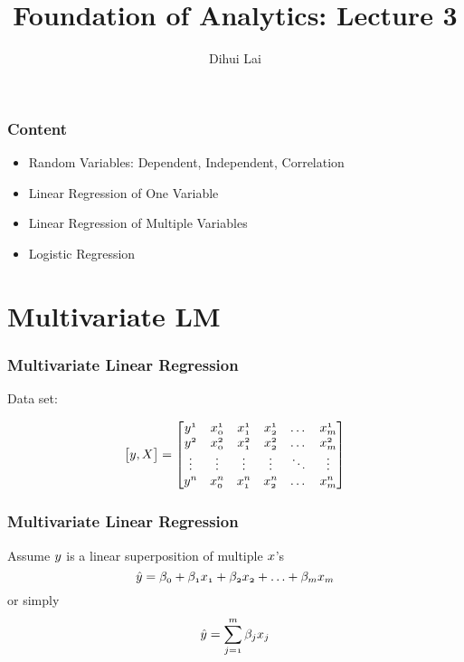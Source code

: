 \documentclass[notheorems, aspectratio=54]{beamer}
\title{Foundation of Analytics: Lecture 3}
\author{Dihui Lai}
\institute[WUSTL]{dlai@wustl.edu}
\begin{document}
\begin{frame}
    \titlepage
\end{frame}


\begin{frame}
\frametitle{Content}

\begin{itemize}
\item Random Variables: Dependent, Independent, Correlation 
\item Linear Regression of One Variable
\item Linear Regression of Multiple Variables
\item Logistic Regression
\end{itemize}
\end{frame}


\section{Multivariate LM}
\begin{frame}
\frametitle{Multivariate Linear Regression}
Data set:

$$
\begin{bmatrix}

\mathnormal{y, X}

\end{bmatrix}
=
\begin{bmatrix}
    \mathnormal{{y}^{1}}& \mathnormal{x^{1}_{0}}& \mathnormal{x^{1}_{1}} & \mathnormal{x^{1}_{2}} & \dots & \mathnormal{x^{1}_{m}} \\
    \mathnormal{{y}^{2}}& \mathnormal{x^{2}_{0}}& \mathnormal{x^{2}_{1}} & \mathnormal{x^{2}_{2}} & \dots & \mathnormal{x^{2}_{m}} \\
    	\vdots & \vdots     & \vdots & \vdots &\ddots &\vdots\\
    \mathnormal{{y}^{n}}& \mathnormal{x^{n}_{0}}& \mathnormal{x^{n}_{1}} & \mathnormal{x^{n}_{2}} & \dots & \mathnormal{x^{n}_{m}} \\
\end{bmatrix}
$$
\end{frame}

\begin{frame}
\frametitle{Multivariate Linear Regression}
Assume $\mathnormal{y}$ is a linear superposition of multiple $\mathnormal{x}$'s
    $$
	\mathnormal{\hat{y}=\beta_{0}+\beta_{1}x_1+\beta_{2}x_2+\hdots+\beta_{m}x_m}
    $$
    or simply
    $$
	\mathnormal{\hat{y}=\sum\limits_{j=1}^{m}\beta_j x_j}     
	$$
        

\end{frame}
\end{document}
